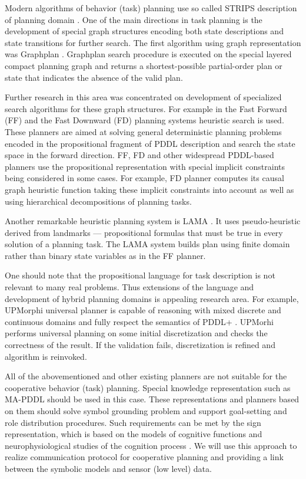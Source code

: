 \documentclass[runningheads,a4paper]{llncs}
\begin{document}
Modern algorithms of behavior (task) planning use so called STRIPS description of planning domain \cite{Fikes1971}. One of the main directions in task planning is the development of special graph structures encoding both state descriptions and state transitions for further search. The first algorithm using graph representation was Graphplan \cite{Blum1997}. Graphplan search procedure is executed on the special layered compact planning graph and returns a shortest-possible partial-order plan or state that indicates the absence of the valid plan.

Further research in this area was concentrated on development of specialized search algorithms for these graph structures. For example in the Fast Forward (FF) \cite{Hoffmann2001} and the Fast Downward (FD) planning systems \cite{Helmert2006} heuristic search is used. These planners are aimed at solving general deterministic planning problems encoded in the propositional fragment of PDDL description \cite{Fox2003} and search the state space in the forward direction. FF, FD and other widespread PDDL-based planners use the propositional representation with special implicit constraints being considered in some cases. For example, FD planner computes its causal graph  heuristic function taking these implicit constraints into account as well as using hierarchical decompositions of planning tasks.

Another remarkable heuristic planning system is LAMA \cite{Richter2010}. It uses pseudo-heuristic derived from landmarks --- propositional formulas that must be true in every solution of a planning task. The LAMA system builds plan using finite domain rather than binary state variables as in the FF planner.

One should note that the propositional language for task description is not relevant to many real problems. Thus extensions of the language and development of hybrid planning domains is appealing research area. For example, UPMorphi universal planner \cite{Della2012} is capable of reasoning with mixed discrete and continuous domains and fully respect  the semantics of PDDL+ \cite{Fox2006}. UPMorhi performs universal planning on some initial discretization and checks the correctness of the result. If the validation fails, discretization is refined and algorithm is reinvoked. 

All of the abovementioned and other existing planners are not suitable for the cooperative behavior (task) planning. Special knowledge representation such as MA-PDDL \cite{Kovacs2012} should be used in this case. These representations and planners based on them should solve symbol grounding problem \cite{Harnad1990} and support goal-setting and role distribution procedures. Such requirements can be met by the sign representation, which is based on the models of cognitive functions \cite{Osipov2014} and neurophysiological studies of the cognition process \cite{Edelman1987,Ivanitsky1997}. We will use this approach to realize communication protocol for cooperative planning and providing a link between the symbolic models and sensor (low level) data.
\end{document}
